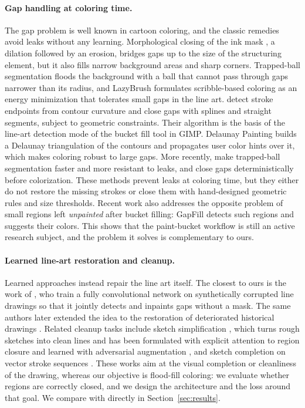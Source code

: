 \documentclass[11pt]{article}
\begin{document}
\paragraph{Gap handling at coloring time.}
The gap problem is well known in cartoon coloring, and the classic remedies avoid
leaks without any learning. Morphological closing of the ink mask
\citep{serra1982morphology,soille2003morphological}, a dilation followed by an
erosion, bridges gaps up to the size of the structuring element, but it also fills
narrow background areas and sharp corners. Trapped-ball segmentation
\citep{zhang2009vectorizing} floods the background with a ball that cannot pass
through gaps narrower than its radius, and LazyBrush \citep{sykora2009lazybrush}
formulates scribble-based coloring as an energy minimization that tolerates small
gaps in the line art. \citet{fourey2018flat} detect stroke endpoints from
contour curvature and close gaps with splines and straight segments, subject to
geometric constraints. Their algorithm is the basis of the line-art detection mode
of the bucket fill tool in GIMP. Delaunay Painting \citep{parakkat2022delaunay} builds a
Delaunay triangulation of the contours and propagates user color hints over it,
which makes coloring robust to large gaps. More recently, \citet{allen2024leak}
make trapped-ball segmentation faster and more resistant to leaks, and
\citet{asrin2025gap} close gaps deterministically before colorization. These methods prevent leaks at coloring
time, but they either do not restore the missing strokes or close them with
hand-designed geometric rules and size thresholds. Recent work also addresses the
opposite problem of small regions left \emph{unpainted} after bucket filling:
GapFill \citep{kono2026gapfill} detects such regions and suggests their colors. This
shows that the paint-bucket workflow is still an active research subject, and the
problem it solves is complementary to ours.

\paragraph{Learned line-art restoration and cleanup.}
Learned approaches instead repair the line art itself. The closest to ours is the
work of \citet{sasaki2017joint}, who train a fully convolutional network on
synthetically corrupted line drawings so that it jointly detects and inpaints gaps
without a mask. The same authors later extended the idea to the restoration of deteriorated
historical drawings \citep{sasaki2018restore}. Related cleanup tasks include sketch
simplification \citep{simoserra2016simplify}, which turns rough sketches into clean lines and has been formulated
with explicit attention to region closure \citep{liu2015closure} and learned with
adversarial augmentation \citep{simoserra2018mastering}, and sketch completion on
vector stroke sequences \citep{lin2020sketchbert}. These works aim at the visual
completion or cleanliness of the drawing, whereas our objective is flood-fill
coloring: we evaluate whether regions are correctly closed, and we design the
architecture and the loss around that goal. We compare with
\citet{sasaki2017joint} directly in Section~\ref{sec:results}.
\end{document}
